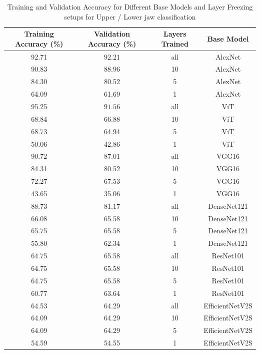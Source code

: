 \documentclass{article}
\begin{document}
\begin{table}[ht]
    \centering
        \begin{tabular}{|c|c|c|c|}
            \hline
            \textbf{Training Accuracy (\%)} & \textbf{Validation Accuracy (\%)} & \textbf{Layers Trained} & \textbf{Base Model} \\ \hline
            92.71 & $\mathbf{92.21}$ & all  & AlexNet \cite{alexnet}       \\\hline
            90.83 & 88.96 & 10   & AlexNet \cite{alexnet}      \\\hline
            84.30 & 80.52 & 5    & AlexNet \cite{alexnet}      \\\hline
            64.09 & 61.69 & 1    & AlexNet \cite{alexnet}      \\\hline
            95.25 & $\mathbf{91.56}$ & all  & ViT  \cite{vit}         \\\hline
            68.84 & 66.88 & 10   & ViT  \cite{vit}         \\\hline
            68.73 & 64.94 & 5    & ViT  \cite{vit}         \\\hline
            50.06 & 42.86 & 1    & ViT  \cite{vit}         \\\hline
            90.72 & $\mathbf{87.01}$ & all  & VGG16     \cite{vgg}    \\\hline
            84.31 & 80.52 & 10   & VGG16   \cite{vgg}      \\\hline
            72.27 & 67.53 & 5    & VGG16   \cite{vgg}      \\\hline
            43.65 & 35.06 & 1    & VGG16   \cite{vgg}      \\\hline
            88.73 & 81.17 & all  & DenseNet121 \cite{densenet}  \\\hline
            66.08 & 65.58 & 10   & DenseNet121 \cite{densenet}  \\\hline
            65.75 & 65.58 & 5    & DenseNet121 \cite{densenet}  \\\hline
            55.80 & 62.34 & 1    & DenseNet121 \cite{densenet}  \\\hline
            64.75 & 65.58 & all  & ResNet101  \cite{resnet}   \\ \hline
            64.75 & 65.58 & 10   & ResNet101   \cite{resnet}  \\\hline
            64.75 & 65.58 & 5    & ResNet101  \cite{resnet}   \\\hline
            60.77 & 63.64 & 1    & ResNet101  \cite{resnet}   \\\hline
            64.53 & 64.29 & all  & EfficientNetV2S  \cite{efficientnetv2} \\\hline
            64.09 & 64.29 & 10   & EfficientNetV2S \cite{efficientnetv2}  \\\hline
            64.09 & 64.29 & 5    & EfficientNetV2S \cite{efficientnetv2}  \\\hline
            54.59 & 54.55 & 1    & EfficientNetV2S \cite{efficientnetv2} \\\hline
        \end{tabular}
    \caption{Training and Validation Accuracy for Different Base Models and Layer Freezing setups for Upper / Lower jaw classification}
    \label{tab:model_accuracy}
\end{table}
\end{document}
